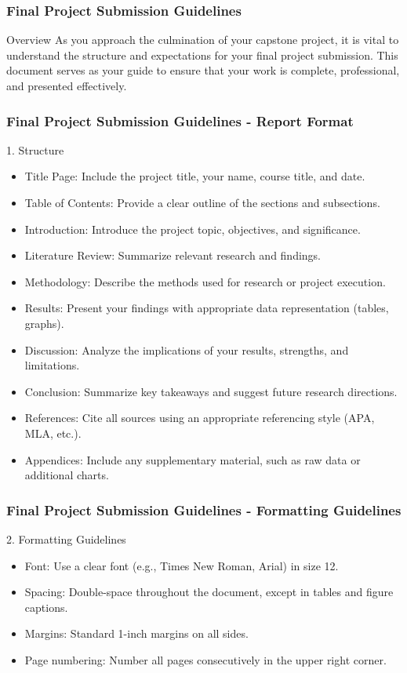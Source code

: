 \documentclass[aspectratio=169]{beamer}
\begin{document}
\begin{frame}[fragile]
  \frametitle{Final Project Submission Guidelines}
  \begin{block}{Overview}
    As you approach the culmination of your capstone project, it is vital to understand the structure and expectations for your final project submission. This document serves as your guide to ensure that your work is complete, professional, and presented effectively.
  \end{block}
\end{frame}

\begin{frame}[fragile]
  \frametitle{Final Project Submission Guidelines - Report Format}
  \begin{block}{1. Structure}
    \begin{itemize}
      \item Title Page: Include the project title, your name, course title, and date.
      \item Table of Contents: Provide a clear outline of the sections and subsections.
      \item Introduction: Introduce the project topic, objectives, and significance.
      \item Literature Review: Summarize relevant research and findings.
      \item Methodology: Describe the methods used for research or project execution.
      \item Results: Present your findings with appropriate data representation (tables, graphs).
      \item Discussion: Analyze the implications of your results, strengths, and limitations.
      \item Conclusion: Summarize key takeaways and suggest future research directions.
      \item References: Cite all sources using an appropriate referencing style (APA, MLA, etc.).
      \item Appendices: Include any supplementary material, such as raw data or additional charts.
    \end{itemize}
  \end{block}
\end{frame}

\begin{frame}[fragile]
  \frametitle{Final Project Submission Guidelines - Formatting Guidelines}
  \begin{block}{2. Formatting Guidelines}
    \begin{itemize}
      \item Font: Use a clear font (e.g., Times New Roman, Arial) in size 12.
      \item Spacing: Double-space throughout the document, except in tables and figure captions.
      \item Margins: Standard 1-inch margins on all sides.
      \item Page numbering: Number all pages consecutively in the upper right corner.
    \end{itemize}
  \end{block}
\end{frame}
\end{document}
